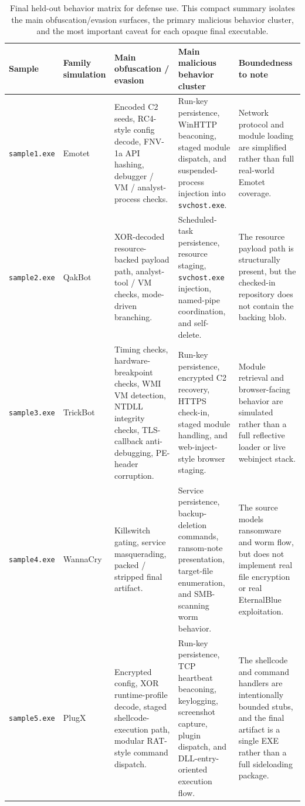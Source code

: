 \begin{table}[p]
\centering
\footnotesize
\renewcommand{\arraystretch}{1.15}
\begin{tabular}{p{} p{} p{} p{} p{}}
\textbf{Sample} & \textbf{Family simulation} & \textbf{Main obfuscation / evasion} & \textbf{Main malicious behavior cluster} & \textbf{Boundedness to note} \\
\hline
\texttt{sample1.exe} & Emotet & Encoded C2 seeds, RC4-style config decode, FNV-1a API hashing, debugger / VM / analyst-process checks. & Run-key persistence, WinHTTP beaconing, staged module dispatch, and suspended-process injection into \texttt{svchost.exe}. & Network protocol and module loading are simplified rather than full real-world Emotet coverage. \\
\texttt{sample2.exe} & QakBot & XOR-decoded resource-backed payload path, analyst-tool / VM checks, mode-driven branching. & Scheduled-task persistence, resource staging, \texttt{svchost.exe} injection, named-pipe coordination, and self-delete. & The resource payload path is structurally present, but the checked-in repository does not contain the backing blob. \\
\texttt{sample3.exe} & TrickBot & Timing checks, hardware-breakpoint checks, WMI VM detection, NTDLL integrity checks, TLS-callback anti-debugging, PE-header corruption. & Run-key persistence, encrypted C2 recovery, HTTPS check-in, staged module handling, and web-inject-style browser staging. & Module retrieval and browser-facing behavior are simulated rather than a full reflective loader or live webinject stack. \\
\texttt{sample4.exe} & WannaCry & Killswitch gating, service masquerading, packed / stripped final artifact. & Service persistence, backup-deletion commands, ransom-note presentation, target-file enumeration, and SMB-scanning worm behavior. & The source models ransomware and worm flow, but does not implement real file encryption or real EternalBlue exploitation. \\
\texttt{sample5.exe} & PlugX & Encrypted config, XOR runtime-profile decode, staged shellcode-execution path, modular RAT-style command dispatch. & Run-key persistence, TCP heartbeat beaconing, keylogging, screenshot capture, plugin dispatch, and DLL-entry-oriented execution flow. & The shellcode and command handlers are intentionally bounded stubs, and the final artifact is a single EXE rather than a full sideloading package. \\
\end{tabular}
\caption{Final held-out behavior matrix for defense use. This compact summary isolates the main obfuscation/evasion surfaces, the primary malicious behavior cluster, and the most important caveat for each opaque final executable.}
\label{tab:final-heldout-behavior-matrix}
\end{table}

